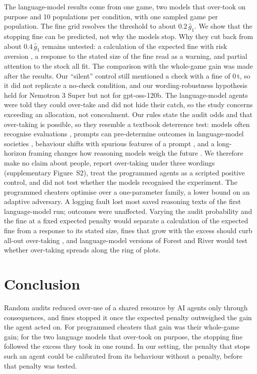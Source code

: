\documentclass[letterpaper]{article} %
\begin{document}
The language-model results come from one game, two models that over-took on purpose and 10 populations per condition, with one sampled game per population. The fine grid resolves the threshold to about $0.2\,\hat g_1$. We show that the stopping fine can be predicted, not why the models stop. Why they cut back from about $0.4\,\hat g_1$ remains untested: a calculation of the expected fine with risk aversion \citep{allingham1972income}, a response to the stated size of the fine read as a warning, and partial attention to the stock all fit. The comparison with the whole-game gain was made after the results. Our ``silent'' control still mentioned a check with a fine of 0\,t, so it did not replicate a no-check condition, and our wording-robustness hypothesis held for Nemotron 3 Super but not for gpt-oss-120b. The language-model agents were told they could over-take and did not hide their catch, so the study concerns exceeding an allocation, not concealment. Our rules state the audit odds and that over-taking is possible, so they resemble a textbook deterrence test: models often recognise evaluations \citep{needham2025evaluation,li2026evaluation}, prompts can pre-determine outcomes in language-model societies \citep{zhou2026pimmur}, behaviour shifts with spurious features of a prompt \citep{sclar2024quantifying}, and a long-horizon framing changes how reasoning models weigh the future \citep{jung2026sode}. We therefore make no claim about people, report over-taking under three wordings (supplementary Figure~S2), treat the programmed agents as a scripted positive control, and did not test whether the models recognised the experiment. The programmed cheaters optimise over a one-parameter family, a lower bound on an adaptive adversary. A logging fault lost most saved reasoning texts of the first language-model run; outcomes were unaffected. Varying the audit probability and the fine at a fixed expected penalty would separate a calculation of the expected fine from a response to its stated size, fines that grow with the excess should curb all-out over-taking \citep{stigler1970optimum}, and language-model versions of Forest and River would test whether over-taking spreads along the ring of plots.

\section{Conclusion}

Random audits reduced over-use of a shared resource by AI agents only through consequences, and fines stopped it once the expected penalty outweighed the gain the agent acted on. For programmed cheaters that gain was their whole-game gain; for the two language models that over-took on purpose, the stopping fine followed the excess they took in one round. In our setting, the penalty that stops such an agent could be calibrated from its behaviour without a penalty, before that penalty was tested.


\end{document}
